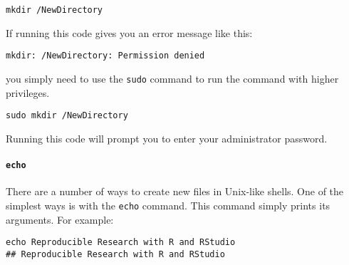 \begin{knitrout}
\color{fgcolor}\begin{kframe}
\begin{verbatim}
mkdir /NewDirectory
\end{verbatim}
\end{kframe}
\end{knitrout}


\noindent If running this code gives you an error message like this:

\begin{knitrout}
\color{fgcolor}\begin{kframe}
\begin{verbatim}
mkdir: /NewDirectory: Permission denied
\end{verbatim}
\end{kframe}
\end{knitrout}


\noindent you simply need to use the \texttt{sudo} command to run the command with higher privileges. 

\begin{knitrout}
\color{fgcolor}\begin{kframe}
\begin{verbatim}
sudo mkdir /NewDirectory
\end{verbatim}
\end{kframe}
\end{knitrout}


\noindent Running this code will prompt you to enter your administrator password.

\paragraph{{\tt{echo}}}

There are a number of ways to create new files in Unix-like shells. One of the simplest ways is with the \texttt{echo} command. This command simply prints its arguments. For example:

\begin{knitrout}
\color{fgcolor}\begin{kframe}
\begin{verbatim}
echo Reproducible Research with R and RStudio
## Reproducible Research with R and RStudio
\end{verbatim}
\end{kframe}
\end{knitrout}


